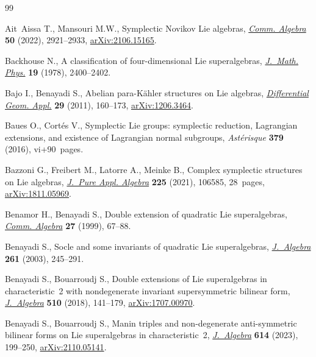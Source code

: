 \documentclass[pdftex]{sigma}
\numberwithin{equation}{section}
\begin{document}
\begin{thebibliography}{99}
\footnotesize\itemsep=0pt

Ait~Aissa T., Mansouri M.W., Symplectic {N}ovikov {L}ie algebras, \href{https://doi.org/10.1080/00927872.2021.2022157}{\textit{Comm.
 Algebra}} \textbf{50} (2022), 2921--2933, \href{https://arxiv.org/abs/2106.15165}{arXiv:2106.15165}.

Backhouse N., A classification of four-dimensional {L}ie superalgebras,
 \href{https://doi.org/10.1063/1.523598}{\textit{J.~Math. Phys.}} \textbf{19} (1978), 2400--2402.

Bajo I., Benayadi S., Abelian para-{K}\"ahler structures on {L}ie algebras,
 \href{https://doi.org/10.1016/j.difgeo.2011.02.003}{\textit{Differential Geom. Appl.}} \textbf{29} (2011), 160--173,
 \href{https://arxiv.org/abs/1206.3464}{arXiv:1206.3464}.

Baues O., Cort\'es V., Symplectic {L}ie groups: symplectic reduction,
 {L}agrangian extensions, and existence of {L}agrangian normal subgroups,
 \textit{Ast\'erisque} \textbf{379} (2016), vi+90~pages.

Bazzoni G., Freibert M., Latorre A., Meinke B., Complex symplectic structures
 on {L}ie algebras, \href{https://doi.org/10.1016/j.jpaa.2020.106585}{\textit{J.~Pure Appl. Algebra}} \textbf{225} (2021),
 106585, 28~pages, \href{https://arxiv.org/abs/1811.05969}{arXiv:1811.05969}.

Benamor H., Benayadi S., Double extension of quadratic {L}ie superalgebras,
 \href{https://doi.org/10.1080/00927879908826421}{\textit{Comm. Algebra}} \textbf{27} (1999), 67--88.

Benayadi S., Socle and some invariants of quadratic {L}ie superalgebras,
 \href{https://doi.org/10.1016/S0021-8693(02)00682-8}{\textit{J.~Algebra}} \textbf{261} (2003), 245--291.

Benayadi S., Bouarroudj S., Double extensions of {L}ie superalgebras in
 characteristic~2 with nondegenerate invariant supersymmetric bilinear form,
 \href{https://doi.org/10.1016/j.jalgebra.2018.06.005}{\textit{J.~Algebra}} \textbf{510} (2018), 141--179, \href{https://arxiv.org/abs/1707.00970}{arXiv:1707.00970}.

Benayadi S., Bouarroudj S., Manin triples and non-degenerate anti-symmetric
 bilinear forms on {L}ie superalgebras in characteristic~2,
 \href{https://doi.org/10.1016/j.jalgebra.2022.09.019}{\textit{J.~Algebra}} \textbf{614} (2023), 199--250, \href{https://arxiv.org/abs/2110.05141}{arXiv:2110.05141}.


\end{thebibliography}
\end{document}

